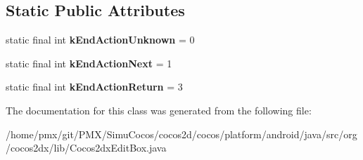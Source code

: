 \subsection*{Static Public Attributes}
\begin{DoxyCompactItemize}
\item 
\mbox{\label{classorg_1_1cocos2dx_1_1lib_1_1Cocos2dxEditBox_a874bf1727945e49f3c0e0c30eba414df}} 
static final int {\bfseries k\+End\+Action\+Unknown} = 0
\item 
\mbox{\label{classorg_1_1cocos2dx_1_1lib_1_1Cocos2dxEditBox_a8c1c436627e83445cf6988292bc93d35}} 
static final int {\bfseries k\+End\+Action\+Next} = 1
\item 
\mbox{\label{classorg_1_1cocos2dx_1_1lib_1_1Cocos2dxEditBox_a00d938e9dd669062b22d48ef800d53fa}} 
static final int {\bfseries k\+End\+Action\+Return} = 3
\end{DoxyCompactItemize}


The documentation for this class was generated from the following file\+:\begin{DoxyCompactItemize}
\item 
/home/pmx/git/\+P\+M\+X/\+Simu\+Cocos/cocos2d/cocos/platform/android/java/src/org/cocos2dx/lib/Cocos2dx\+Edit\+Box.\+java\end{DoxyCompactItemize}

